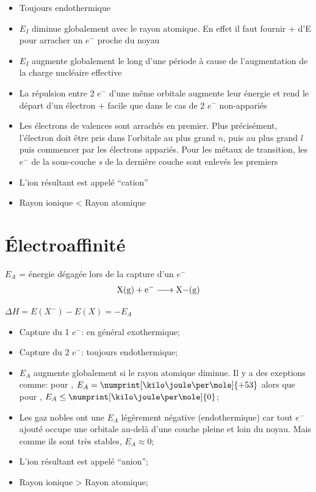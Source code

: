 \documentclass[11pt,a4paper,french]{article}
\begin{document}
\begin{itemize}
	\item Toujours endothermique
	\item $E_I$ diminue globalement avec le rayon atomique.
		En effet il faut fournir + d'E pour arracher un $e^-$ proche du noyau
	\item $E_I$ augmente globalement le long d'une période à cause de l'augmentation de la charge nucléaire effective
	\item La répulsion entre 2 $e^-$ d'une même orbitale augmente leur énergie et rend le départ d'un électron + facile que dans le cas de 2 $e^-$ non-appariés
	\item Les électrons de valences sont arrachés en premier.
		Plus précisément, l'électron doit être pris dans l'orbitale au plus grand $n$, puis au plus grand $l$ puis commencer par les électrons appariés.
		Pour les métaux de transition, les $e^-$ de la sous-couche \textit{s} de la dernière couche sont enlevés les premiers
	\item L'ion résultant est appelé ``cation''
	\item Rayon ionique < Rayon atomique
\end{itemize}

\section{\'Electroaffinité}
\label{sec:electro}

$E_A$ = énergie dégagée lors de la capture d'un $e^-$
\[ \ce{X(g) + e- -> X-(g)} \]

$\Delta H = E(X^-)-E(X)=-E_A$

\begin{itemize}
	\item Capture du 1 $e^-$: en général exothermique;
	\item Capture du 2 $e^-$: toujours endothermique;
	\item $E_A$ augmente globalement si le rayon atomique diminue.
		Il y a des exeptions comme:
		pour , $E_A = \numprint[\kilo\joule\per\mole]{+53}$ alors que pour , $E_A \leq \numprint[\kilo\joule\per\mole]{0}$;
	\item Les gaz nobles ont une $E_A$ légèrement négative (endothermique) car tout $e^-$ ajouté occupe une orbitale au-delà d'une couche pleine et loin du noyau.
		Mais comme ils sont très stables, $E_A \approx 0$;
	\item L'ion résultant est appelé ``anion'';
	\item Rayon ionique > Rayon atomique;
\end{itemize}
\end{document}
